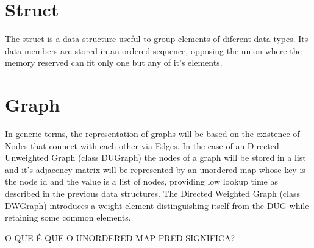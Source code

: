 \section{Struct}
The struct is a data structure useful to group elements of diferent data types. Its data members are stored in an ordered sequence, opposing the union where the memory reserved can fit only one but any of it's elements.

\section{Graph}
In generic terms, the representation of graphs will be based on the existence of Nodes that connect with each other via Edges.
In the case of an Directed Unweighted Graph (class DUGraph) the nodes of a graph will be stored in a list and it's adjacency matrix will be represented by an unordered map whose key is the node id and the value is a list of nodes, providing low lookup time as described in the previous data structures.
The Directed Weighted Graph (class DWGraph) introduces a weight element distinguishing itself
from the DUG while retaining some common elements.

O QUE É QUE O UNORDERED MAP PRED SIGNIFICA?
